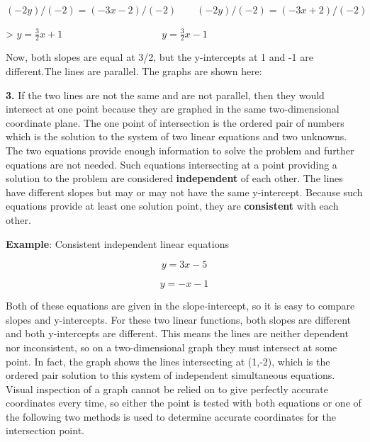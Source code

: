 $(-2y)/(-2) = (-3x - 2)/(-2) \qquad  (-2y)/(-2) = (-3x + 2)/(-2)$



> $y = \frac{3}{2} x + 1 \qquad  \qquad \qquad  \qquad \qquad y = \frac{3}{2} x - 1$



Now, both slopes are equal at 3/2, but the y-intercepts at 1 and -1 are different.The
lines are parallel. The graphs are shown here:






\textbf{3.} If the two lines are not the same and are not parallel, then they would intersect at one point because they are graphed in the same two-dimensional coordinate plane. The one point of intersection is the ordered pair of numbers which is the solution to the system of two linear equations and two unknowns. The two equations provide enough information to solve the problem and further equations are not needed. Such equations intersecting at a point providing a solution to the problem are considered \textbf{independent} of each other. The lines have different slopes but may or may not have the same y-intercept. Because such equations provide at least one solution point, they are \textbf{consistent} with each other.



\textbf{Example}: Consistent independent linear equations



$$y = 3x - 5 $$



$$y = -x - 1 $$



Both of these equations are given in the slope-intercept, so it is easy to compare slopes
and y-intercepts. For these two linear functions, both slopes are different and both
y-intercepts are different. This means the lines are neither dependent nor inconsistent,
so on a two-dimensional graph they must intersect at some point. In fact, the graph shows
the lines intersecting at (1,-2), which is the ordered pair solution to this system of
independent simultaneous equations. Visual inspection of a graph cannot be relied on to
give perfectly accurate coordinates every time, so either the point is tested with both
equations or one of the following two methods is used to determine accurate coordinates
for the intersection point.







